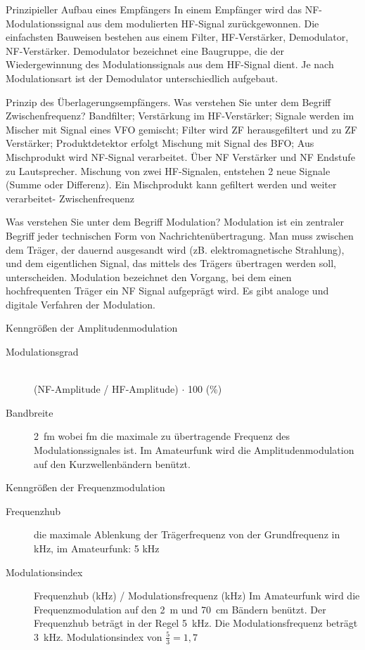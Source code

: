 \documentclass[avery5371,grid,frame,a4paper]{flashcards}
\newcommand{\card}[3]{
  \begin{flashcard}[{\chap} -- #1]{#2}#3\end{flashcard}
}
\begin{document}
\card{13}{Prinzipieller Aufbau eines Empfängers}{
  In einem Empfänger wird das NF-Modulationssignal aus dem modulierten HF-Signal zurückgewonnen.
  Die einfachsten Bauweisen bestehen aus einem Filter, HF-Verstärker, Demodulator, NF-Verstärker.
  Demodulator bezeichnet eine Baugruppe, die der Wiedergewinnung des Modulationssignals aus dem HF-Signal dient. Je nach Modulationsart ist der Demodulator unterschiedlich aufgebaut.
}
\card{14}{Prinzip des Überlagerungsempfängers. Was verstehen Sie unter dem Begriff Zwischenfrequenz?}{
  Bandfilter; Verstärkung im HF-Verstärker; Signale werden im Mischer mit Signal eines VFO gemischt; Filter wird ZF herausgefiltert und zu ZF Verstärker; Produktdetektor erfolgt Mischung mit Signal des BFO; Aus Mischprodukt wird NF-Signal verarbeitet. Über NF Verstärker und NF Endstufe zu Lautsprecher.
  Mischung von zwei HF-Signalen, entstehen 2 neue Signale (Summe oder Differenz). Ein Mischprodukt kann gefiltert werden und weiter verarbeitet- Zwischenfrequenz} %
\card{16}{Was verstehen Sie unter dem Begriff Modulation?}{
  Modulation ist ein zentraler Begriff jeder technischen Form von Nachrichtenübertragung. Man muss zwischen dem Träger, der dauernd ausgesandt wird (zB. elektromagnetische Strahlung), und dem eigentlichen Signal, das mittels des Trägers übertragen werden soll, unterscheiden. Modulation bezeichnet den Vorgang, bei dem einen hochfrequenten Träger ein NF Signal aufgeprägt wird. Es gibt analoge und digitale Verfahren der Modulation.}
\card{17}{Kenngrößen der Amplitudenmodulation}{
  \begin{description}
    \item[Modulationsgrad] \hfill{} \\ (NF-Amplitude / HF-Amplitude) $\cdot$ 100 (\%)
    \item[Bandbreite]
      2~fm wobei fm die maximale zu übertragende Frequenz des Modulationssignales ist.
      Im Amateurfunk wird die Amplitudenmodulation auf den Kurzwellenbändern benützt.
  \end{description}
}
\card{18}{Kenngrößen der Frequenzmodulation}{
  \begin{description}
    \item[Frequenzhub] die maximale Ablenkung der Trägerfrequenz von der Grundfrequenz in kHz,
      im Amateurfunk: 5 kHz
    \item[Modulationsindex]
      Frequenzhub (kHz) / Modulationsfrequenz (kHz)
      Im Amateurfunk wird die Frequenzmodulation auf den 2~m und 70~cm Bändern benützt.
      Der Frequenzhub beträgt in der Regel 5~kHz. Die Modulationsfrequenz beträgt 3~kHz.
      Modulationsindex von $\frac53 = 1,7$
  \end{description}
}
\end{document}
